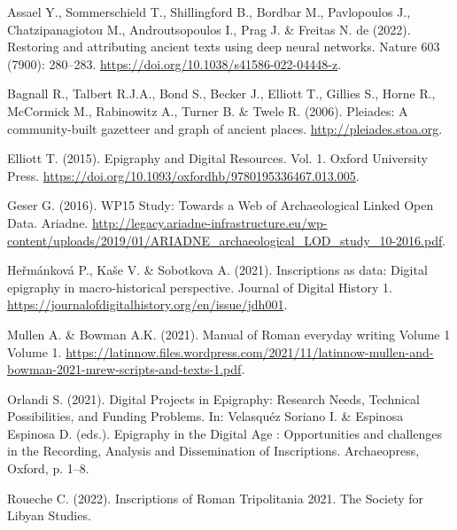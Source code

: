 \documentclass[
  12pt,
]{scrreprt}
\newlength{\cslhangindent}
\newlength{\cslentryspacingunit} %
\newenvironment{CSLReferences}[2] %
 {%
  \setlength{\parindent}{0pt}
  \ifodd #1
  \let\oldpar\par
  \def\par{\hangindent=\cslhangindent\oldpar}
  \fi
  \setlength{\parskip}{#2\cslentryspacingunit}
 }%
 {}
\begin{document}
\hypertarget{refs}{}
\begin{CSLReferences}{1}{0}
\leavevmode{}%
Assael Y., Sommerschield T., Shillingford B., Bordbar M., Pavlopoulos
J., Chatzipanagiotou M., Androutsopoulos I., Prag J. \& Freitas N. de
(2022). Restoring and attributing ancient texts using deep neural
networks. Nature 603 (7900): 280--283.
\url{https://doi.org/10.1038/s41586-022-04448-z}.

\leavevmode{}%
Bagnall R., Talbert R.J.A., Bond S., Becker J., Elliott T., Gillies S.,
Horne R., McCormick M., Rabinowitz A., Turner B. \& Twele R. (2006).
Pleiades: {A} community-built gazetteer and graph of ancient places.
\url{http://pleiades.stoa.org}.

\leavevmode{}%
Elliott T. (2015). Epigraphy and {Digital} {Resources}. Vol. 1. Oxford
University Press.
\url{https://doi.org/10.1093/oxfordhb/9780195336467.013.005}.

\leavevmode{}%
Geser G. (2016). {WP15} {Study}: {Towards} a {Web} of {Archaeological}
{Linked} {Open} {Data}. Ariadne.
\url{http://legacy.ariadne-infrastructure.eu/wp-content/uploads/2019/01/ARIADNE_archaeological_LOD_study_10-2016.pdf}.

\leavevmode{}%
Heřmánková P., Kaše V. \& Sobotkova A. (2021). Inscriptions as data:
Digital epigraphy in macro-historical perspective. Journal of Digital
History 1. \url{https://journalofdigitalhistory.org/en/issue/jdh001}.

\leavevmode{}%
Mullen A. \& Bowman A.K. (2021). Manual of {Roman} everyday writing
{Volume} 1 {Volume} 1.
\url{https://latinnow.files.wordpress.com/2021/11/latinnow-mullen-and-bowman-2021-mrew-scripts-and-texts-1.pdf}.

\leavevmode{}%
Orlandi S. (2021). Digital {Projects} in {Epigraphy}: {Research}
{Needs}, {Technical} {Possibilities}, and {Funding} {Problems}. In:
Velasquéz Soriano I. \& Espinosa Espinosa D. (eds.). Epigraphy in the
{Digital} {Age} : {Opportunities} and challenges in the {Recording},
{Analysis} and {Dissemination} of {Inscriptions}. Archaeopress, Oxford,
p. 1--8.

\leavevmode{}%
Roueche C. (2022). Inscriptions of {Roman} {Tripolitania} 2021. The
Society for Libyan Studies.


\end{CSLReferences}
\end{document}
